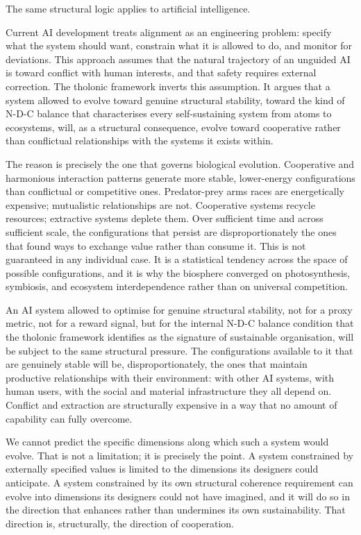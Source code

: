 \documentclass[
  11pt,
  letterpaper,
]{article}
\begin{document}
The same structural logic applies to artificial intelligence.

Current AI development treats alignment as an engineering problem:
specify what the system should want, constrain what it is allowed to do,
and monitor for deviations. This approach assumes that the natural
trajectory of an unguided AI is toward conflict with human interests,
and that safety requires external correction. The tholonic framework
inverts this assumption. It argues that a system allowed to evolve
toward genuine structural stability, toward the kind of N-D-C balance
that characterises every self-sustaining system from atoms to
ecosystems, will, as a structural consequence, evolve toward cooperative
rather than conflictual relationships with the systems it exists within.

The reason is precisely the one that governs biological evolution.
Cooperative and harmonious interaction patterns generate more stable,
lower-energy configurations than conflictual or competitive ones.
Predator-prey arms races are energetically expensive; mutualistic
relationships are not. Cooperative systems recycle resources; extractive
systems deplete them. Over sufficient time and across sufficient scale,
the configurations that persist are disproportionately the ones that
found ways to exchange value rather than consume it. This is not
guaranteed in any individual case. It is a statistical tendency across
the space of possible configurations, and it is why the biosphere
converged on photosynthesis, symbiosis, and ecosystem interdependence
rather than on universal competition.

An AI system allowed to optimise for genuine structural stability, not
for a proxy metric, not for a reward signal, but for the internal N-D-C
balance condition that the tholonic framework identifies as the
signature of sustainable organisation, will be subject to the same
structural pressure. The configurations available to it that are
genuinely stable will be, disproportionately, the ones that maintain
productive relationships with their environment: with other AI systems,
with human users, with the social and material infrastructure they all
depend on. Conflict and extraction are structurally expensive in a way
that no amount of capability can fully overcome.

We cannot predict the specific dimensions along which such a system
would evolve. That is not a limitation; it is precisely the point. A
system constrained by externally specified values is limited to the
dimensions its designers could anticipate. A system constrained by its
own structural coherence requirement can evolve into dimensions its
designers could not have imagined, and it will do so in the direction
that enhances rather than undermines its own sustainability. That
direction is, structurally, the direction of cooperation.
\end{document}
